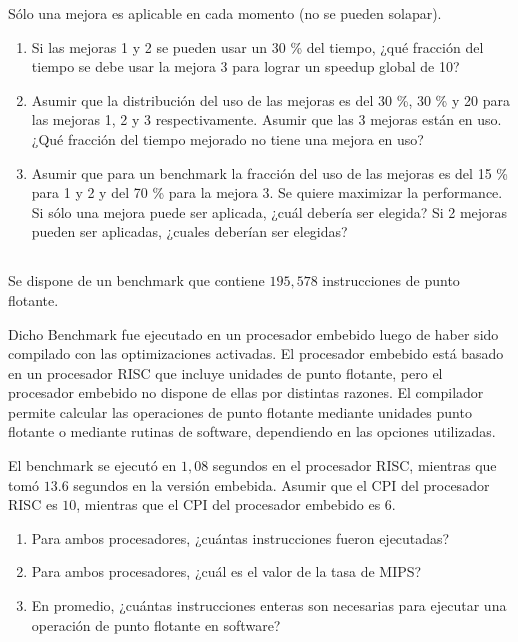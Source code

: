 Sólo una mejora es aplicable en cada momento (no se pueden solapar).

\begin{enumerate}[label=\alph*)]
 \item Si las mejoras 1 y 2 se pueden usar un 30 \% del tiempo, ¿qué fracción del tiempo se debe usar la mejora 3 para lograr un speedup global de 10?
 \item Asumir que la distribución del uso de las mejoras es del 30 \%, 30 \% y 20 para las mejoras 1, 2 y 3 respectivamente. Asumir que las 3 mejoras están en uso. ¿Qué fracción del tiempo mejorado no tiene una mejora en uso?
 \item Asumir que para un benchmark la fracción del uso de las mejoras es del 15 \% para 1 y 2 y del 70 \% para la mejora 3. Se quiere maximizar la performance. Si sólo una mejora puede ser aplicada, ¿cuál debería ser elegida? Si 2 mejoras pueden ser aplicadas, ¿cuales deberían ser elegidas?
\end{enumerate}

\subsection{}
Se dispone de un benchmark que contiene $195,578$ instrucciones de punto flotante.
	
Dicho Benchmark fue ejecutado en un procesador embebido luego de haber sido compilado con las optimizaciones activadas. El procesador embebido está basado en un procesador RISC que incluye unidades de punto flotante, pero el procesador embebido no dispone de ellas por distintas razones. El compilador permite calcular las operaciones de punto flotante mediante unidades punto flotante o mediante rutinas de software, dependiendo en las opciones utilizadas.
	
El benchmark se ejecutó en $1,08$ segundos en el procesador RISC, mientras que tomó $13.6$ segundos en la versión embebida. Asumir que el CPI del procesador RISC es $10$, mientras que el CPI del procesador embebido es $6$.
	
\begin{enumerate}[label=\alph*)]
\item Para ambos procesadores, ¿cuántas instrucciones fueron ejecutadas?
\item Para ambos procesadores, ¿cuál es el valor de la tasa de MIPS?
\item En promedio, ¿cuántas instrucciones enteras son necesarias para ejecutar una operación de punto flotante en software?
\end{enumerate}
	
